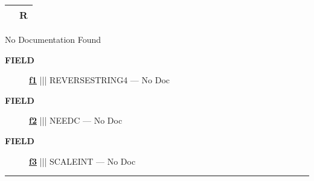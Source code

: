 {\renewcommand{\arraystretch}{1.5}
\begin{tabularx}{\textwidth}{|>{\raggedright\arraybackslash}l|X|}
\hline
\hspace{0pt}\mytexttt{\color{red} } & \textbf{R} \\
\hline
\end{tabularx}
}

\par





No Documentation Found







\par
\begin{description}
\item [\colorbox{tagtype}{\color{white} \textbf{\textsf{FIELD}}}] \textbf{\underline{f1}} ||| REVERSESTRING4 --- No Doc
\item [\colorbox{tagtype}{\color{white} \textbf{\textsf{FIELD}}}] \textbf{\underline{f2}} ||| NEEDC --- No Doc
\item [\colorbox{tagtype}{\color{white} \textbf{\textsf{FIELD}}}] \textbf{\underline{f3}} ||| SCALEINT --- No Doc
\end{description}





\rule{\linewidth}{0.5pt}


